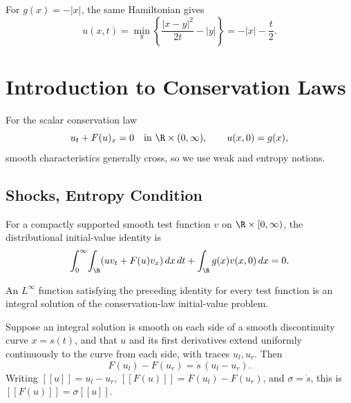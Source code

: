 \begin{example}[Explicit Hopf--Lax solution: $H(p) = \frac{1}{2}|p|^2$, $g = -|x|$]
\label{ex:hopf-lax-explicit-example-ii}
For $g(x)=-|x|$, the same Hamiltonian gives
\[
u(x,t)=\min_y\left\{\frac{|x-y|^2}{2t}-|y|\right\}=-|x|-\frac t2.
\]
\end{example}

\section{Introduction to Conservation Laws}
\label{sec:conservation-laws-intro}

For the scalar conservation law
\[
u_t+F(u)_x=0\quad\text{in }\R\times(0,\infty),\qquad u(x,0)=g(x),
\]
smooth characteristics generally cross, so we use weak and entropy notions.

\subsection{Shocks, Entropy Condition}
\label{sec:shocks-entropy-condition}

For a compactly supported smooth test function $v$ on
$\R\times[0,\infty)$, the distributional initial-value identity is
\[
\int_0^\infty\!\int_\R(uv_t+F(u)v_x)\,dx\,dt+
\int_\R g(x)v(x,0)\,dx=0.
\]

\begin{definition}
\label{def:integral-solution-conservation-law}
An $L^\infty$ function satisfying the preceding identity for every test
function is an integral solution of the conservation-law initial-value
problem.
\end{definition}

\begin{proposition}
\label{prop:rankine-hugoniot-condition}
Suppose an integral solution is smooth on each side of a smooth discontinuity
curve $x=s(t)$, and that $u$ and its first derivatives extend uniformly
continuously to the curve from each side, with traces $u_l,u_r$. Then
\[
F(u_l)-F(u_r)=\dot s\,(u_l-u_r).
\]
Writing $[[u]]=u_l-u_r$, $[[F(u)]]=F(u_l)-F(u_r)$, and $\sigma=\dot s$,
this is $[[F(u)]]=\sigma[[u]]$.
\end{proposition}

